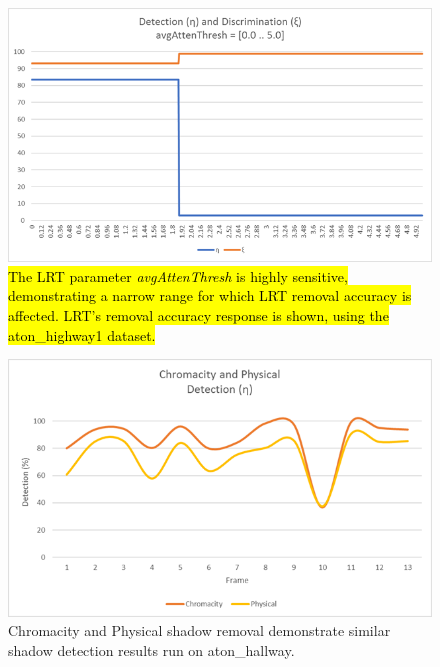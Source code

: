 \begin{figure}
  \centering
  \includegraphics[width=.8\linewidth]{figures/highway1_avgAttenThresh_response.jpg}

\caption{\hl{The LRT parameter \textit{avgAttenThresh} is highly sensitive, demonstrating a narrow range for which LRT removal accuracy is affected. LRT's removal accuracy response is shown, using the aton\_highway1 dataset.}}
\label{fig:avgattenthresh_response}
\end{figure}


\begin{figure}
\centering
  \includegraphics[width=.8\linewidth]{figures/similarities_chromacity_physical_hallway.jpg}

\caption{Chromacity and Physical shadow removal demonstrate similar shadow detection results run on aton\_hallway.}
\label{fig:similarities}
\end{figure}

